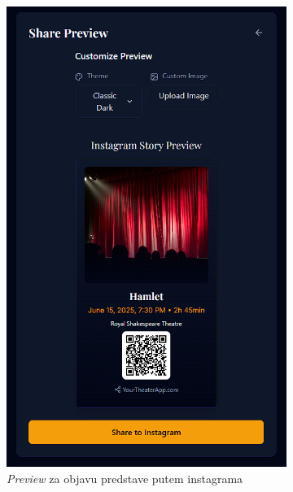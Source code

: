 \begin{itemize}
    \begin{figure}[H]
    \centering
    \begin{subfigure}[b]{0.45\textwidth}
        \centering
        \includegraphics[width=\linewidth]{Slike/FZ5/preview.png}
        \caption{\textit{Preview} za objavu predstave putem instagrama}
        \label{fig:preview}
    \end{subfigure}
    \hfill
    \begin{subfigure}[b]{0.45\textwidth}
        \centering

\end{subfigure}
\end{figure}
\end{itemize}

